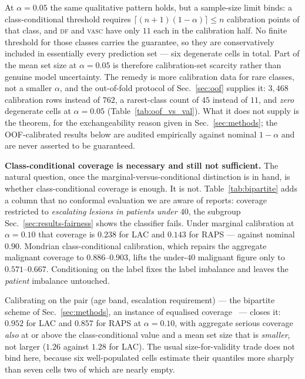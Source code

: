 \documentclass[journal]{IEEEtran}
\begin{document}
At $\alpha = 0.05$ the same qualitative pattern holds, but a sample-size limit binds: a
class-conditional threshold requires $\lceil (n+1)(1-\alpha) \rceil \le n$ calibration points
of that class, and \textsc{df} and \textsc{vasc} have only $11$ each in the calibration half.
No finite threshold for those classes carries the guarantee, so they are conservatively
included in essentially every prediction set --- six degenerate cells in total. Part of the
mean set size at $\alpha=0.05$ is therefore calibration-set scarcity rather than genuine model
uncertainty. The remedy is more calibration data for rare classes, not a smaller $\alpha$, and
the out-of-fold protocol of Sec.~\ref{sec:oof} supplies it: $3{,}468$ calibration rows instead
of $762$, a rarest-class count of $45$ instead of $11$, and \emph{zero} degenerate cells at
$\alpha=0.05$ (Table~\ref{tab:oof_vs_val}). What it does not supply is the theorem, for the
exchangeability reason given in Sec.~\ref{sec:methods}; the OOF-calibrated results below are
audited empirically against nominal $1-\alpha$ and are never asserted to be guaranteed.

\textbf{Class-conditional coverage is necessary and still not sufficient.} The natural
question, once the marginal-versus-conditional distinction is in hand, is whether
class-conditional coverage is enough. It is not. Table~\ref{tab:bipartite} adds a column that
no conformal evaluation we are aware of reports: coverage restricted to \emph{escalating
lesions in patients under $40$}, the subgroup Sec.~\ref{sec:results-fairness} shows the
classifier fails. Under marginal calibration at $\alpha=0.10$ that coverage is $0.238$ for
LAC and $0.143$ for RAPS --- against nominal $0.90$. Mondrian class-conditional calibration,
which repairs the aggregate malignant coverage to $0.886$--$0.903$, lifts the under-$40$
malignant figure only to $0.571$--$0.667$. Conditioning on the label fixes the label
imbalance and leaves the \emph{patient} imbalance untouched.

Calibrating on the pair (age band, escalation requirement) --- the bipartite scheme of
Sec.~\ref{sec:methods}, an instance of equalised coverage~\cite{romano2020equalized} ---
closes it: $0.952$ for LAC and $0.857$ for RAPS at $\alpha=0.10$, with aggregate serious
coverage \emph{also} at or above the class-conditional value and a mean set size that is
\emph{smaller}, not larger ($1.26$ against $1.28$ for LAC). The usual size-for-validity trade
does not bind here, because six well-populated cells estimate their quantiles more sharply
than seven cells two of which are nearly empty.
\end{document}
